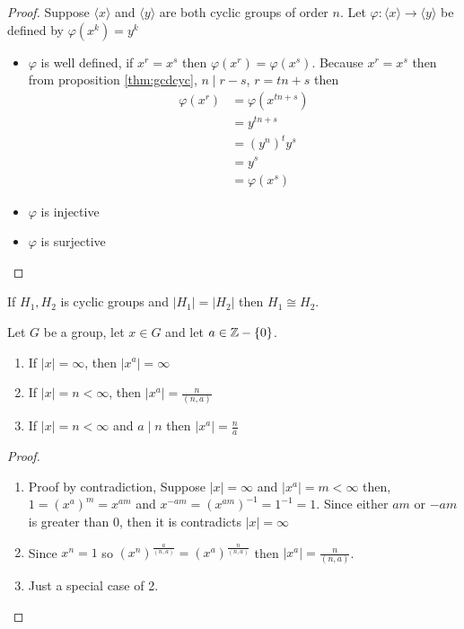 \begin{proof}
  Suppose $\langle x \rangle$ and $\langle y\rangle$ are both cyclic groups of order $n$.
  Let $\varphi: \langle x \rangle \to \langle y\rangle$ be defined by $\varphi(x^k) = y^k$
  \begin{itemize}
    \item $\varphi$ is well defined, if $x^r = x^s$ then $\varphi(x^r) = \varphi(x^s)$. Because $x^r = x^s$ 
    then from proposition \ref{thm:gcdcyc}, $n \mid r-s$, $r = tn+s$ then
    \begin{align*}
      \varphi(x^r) &= \varphi(x^{tn + s}) \\
      &= y^{tn+s} \\
      &= (y^n)^ty^s \\
      &= y^s \\
      &= \varphi(x^s) 
    \end{align*}
    \item $\varphi$ is injective
    \item $\varphi$ is surjective 
  \end{itemize}
\end{proof}

\begin{theorem}
  If $H_1, H_2$ is cyclic groups and $|H_1| = |H_2|$ then $H_1 \cong H_2$.
\end{theorem}

\begin{proposition}
  Let $G$ be a group, let $x \in G$ and let $a \in \mathbb Z - \{0\}$.
  \begin{enumerate}
    \item If $|x| = \infty$, then $|x^a| = \infty$
    \item If $|x| = n < \infty$, then $|x^a| = \frac{n}{(n, a)}$
    \item If $|x| = n < \infty$ and $a \mid n$ then $|x^a| = \frac{n}{a}$
  \end{enumerate} 
\end{proposition}
\begin{proof}
  \text{ }
  \begin{enumerate}
    \item Proof by contradiction, Suppose $|x| = \infty$ and $|x^a| = m < \infty$
    then, $1 = (x^a)^m = x^{am}$ and $x^{-am} = (x^{am})^{-1} = 1^{-1} = 1$.
    Since either $am$ or $-am$ is greater than $0$, then it is contradicts $|x| = \infty$
    \item Since $x^n = 1$ so $(x^n)^\frac{a}{(n, a)} = (x^a)^\frac{n}{(n, a)}$ then $|x^a| = \frac{n}{(n, a)}$.
    \item Just a special case of 2.
  \end{enumerate}
\end{proof}

